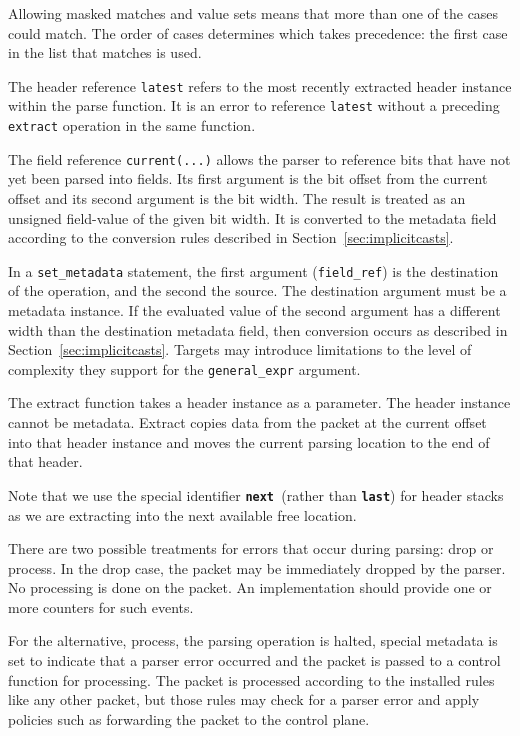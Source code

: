 \documentclass[12pt]{article}
\begin{document}
Allowing masked matches and value sets means that more than one of the cases 
could match. The order of cases determines which takes precedence: the first 
case in the list that matches is used.

The header reference \texttt{latest} refers to the most recently extracted header 
instance within the parse function.  It is an error to reference \texttt{latest} without 
a preceding \texttt{extract} operation in the same function.

The field reference \texttt{current(...)} allows the parser to reference bits that 
have not yet been parsed into fields. Its first argument is the bit offset 
from the current offset and its second argument is the bit width.  The result 
is treated as an unsigned field-value of the given bit width. It is converted 
to the metadata field according to the conversion rules described in Section~\ref{sec:implicitcasts}.

In a \texttt{set_metadata} statement, the first argument (\texttt{field_ref}) 
is the destination of the operation, and the second the source. The destination 
argument must be a metadata instance. If the evaluated value of the second argument 
has a different width than the destination metadata field, then conversion occurs 
as described in Section~\ref{sec:implicitcasts}. Targets may introduce 
limitations to the level of complexity they support for the \texttt{general_expr} 
argument.


The extract function takes a header instance as a parameter.  The header instance 
cannot be metadata. Extract copies data from the packet at the current offset 
into that header instance and moves the current parsing location to the end 
of that header.

Note that we use the special identifier \texttt{\textbf{next} }(rather than 
\texttt{\textbf{last}}) for header stacks as we are extracting into the next available 
free location. 


There are two possible treatments for errors that occur during parsing: drop 
or process. In the drop case, the packet may be immediately dropped by the 
parser. No \matchaction processing is done on the packet. An implementation 
should provide one or more counters for such events.

For the alternative, process, the parsing operation is halted, special metadata 
is set to indicate that a parser error occurred and the packet is passed to 
a control function for \matchaction processing. The packet is processed according 
to the installed \matchaction rules like any other packet, but those rules 
may check for a parser error and apply policies such as forwarding the packet 
to the control plane.
\end{document}
